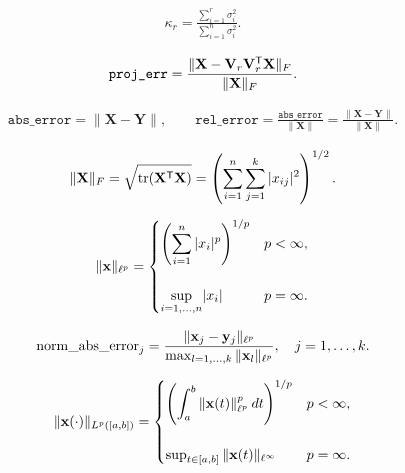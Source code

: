 \documentclass[12 pt]{article}
\begin{document}

\begin{align*}
    \kappa_r
    = \frac{\sum_{i=1}^{r}\sigma_i^2}{\sum_{i=1}^{n}\sigma_i^2}.
\end{align*}

\begin{align*}
    \texttt{proj\_err}
    = \frac{\|\mathbf{X} - \mathbf{V}_r\mathbf{V}_r^{\mathsf T}\mathbf{X}\|_F}{\|\mathbf{X}\|_F}.
\end{align*}

\begin{align*}
    \texttt{abs\_error}
    = \|\mathbf{X} - \mathbf{Y}\|,
    \qquad
    \texttt{rel\_error}
    = \frac{\texttt{abs\_error}}{\|\mathbf{X}\|}
    = \frac{\|\mathbf{X} - \mathbf{Y}\|}{\|\mathbf{X}\|}.
\end{align*}

\begin{align*}
    \|\mathbf{X}\|_{F}
    = \sqrt{\textrm{tr}(\mathbf{X}^{\mathsf T}\mathbf{X})}
    = \left(\sum_{i=1}^{n}\sum_{j=1}^{k}|x_{ij}|^2\right)^{1/2}.
\end{align*}

\begin{align*}
    \|\mathbf{x}\|_{\ell^p}
    = \begin{cases}
    \left(\displaystyle\sum_{i=1}^{n}|x_i|^p\right)^{1/p} & p < \infty,
    \\ & \\
    \underset{i=1,\ldots,n}{\textrm{sup}}|x_i| & p = \infty.
    \end{cases}
\end{align*}

\begin{align*}
    \textrm{norm\_abs\_error}_j
    = \frac{\|\mathbf{x}_j - \mathbf{y}_j\|_{\ell^p}}{\max_{l=1,\ldots,k}\|\mathbf{x}_l\|_{\ell^p}},
    \quad
    j = 1,\ldots,k.
\end{align*}

\begin{align*}
    \|\mathbf{x}(\cdot)\|_{L^p([a,b])}
    = \begin{cases}
    \left(\displaystyle\int_{a}^{b}\|\mathbf{x}(t)\|_{\ell^p}^p\:dt\right)^{1/p} & p < \infty,
    \\ & \\
    \sup_{t\in[a,b]}\|\mathbf{x}(t)\|_{\ell^\infty} & p = \infty.
    \end{cases}
\end{align*}
\end{document}
